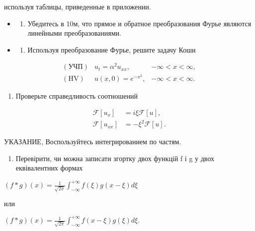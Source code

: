 \documentclass[
  ukrainian,
]{article}
\providecommand{\tightlist}{%
  \setlength{\itemsep}{0pt}\setlength{\parskip}{0pt}}
\begin{document}
используя таблицы, приведенные в приложении.

\begin{itemize}
\tightlist
\item
  \begin{enumerate}
  \def\labelenumi{\arabic{enumi}.}
  \setcounter{enumi}{1}
  \tightlist
  \item
    Убедитесь в 10м, что прямое и обратное преобразования Фурье являются
    линейными преобразованиями.
  \end{enumerate}
\item
  \begin{enumerate}
  \def\labelenumi{\arabic{enumi}.}
  \setcounter{enumi}{2}
  \tightlist
  \item
    Используя преобразование Фурье, решите задачу Коши
  \end{enumerate}
\end{itemize}

\[
\begin{array}{lll} (\text{УЧП}) & u_t = \alpha^2 u_{xx}, & -\infty < x < \infty, \\ (\text{HV}) & u(x, 0) = e^{-x^2}, & -\infty < x < \infty. \end{array}
\]

\begin{enumerate}
\def\labelenumi{\arabic{enumi}.}
\setcounter{enumi}{3}
\tightlist
\item
  Проверьте справедливость соотношений
\end{enumerate}

\[
\begin{aligned} \mathcal{F}\left[u_{x}\right] &= i\xi \mathcal{F}\left[u\right], \\ \mathcal{F}\left[u_{xx}\right] &= -\xi^{2} \mathcal{F}\left[u\right]. \end{aligned}
\]

УКАЗАНИЕ, Воспользуйтесь интегрированием по частям.

\begin{enumerate}
\def\labelenumi{\arabic{enumi}.}
\setcounter{enumi}{4}
\tightlist
\item
  Перевірити, чи можна записати згортку двох функцій f і g у двох
  еквівалентних формах
\end{enumerate}

\((f * g)(x) = \frac{1}{\sqrt{2\pi}} \int_{-\infty}^{+\infty} f(\xi) g(x - \xi) d\xi\)

или

\((f * g)(x) = \frac{1}{\sqrt{2\pi}} \int_{-\infty}^{+\infty} f(x-\xi) g(\xi) d\xi.\)
\end{document}
